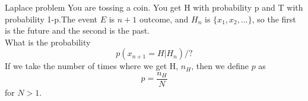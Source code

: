 Laplace problem
You are tossing a coin. You get H with probability p and T with probability 1-p.The event $E$ is $n+1$ outcome, and $H_n$ is $\{x_1,x_2,...\}$, so the first is the future and the second is the past. \\
What is the probability
$$
	p(x_{n+1}=H | H_n) / ? %
$$
If we take the number of times where we get H, $n_H$, then we define $p$ as
$$
	p = \frac{n_H}{N}
$$
for $N > 1$.
